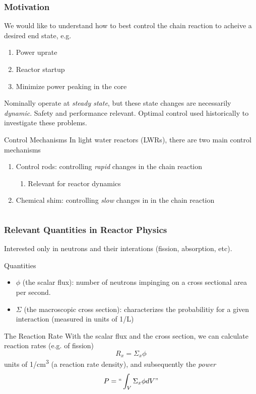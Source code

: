\documentclass[10pt,compress]{beamer}
\begin{document}
\begin{frame}\frametitle{Motivation}
We would like to understand how to best control the chain reaction to acheive a desired end state, e.g.
\begin{enumerate}
    \item Power uprate
    \item Reactor startup
    \item Minimize power peaking in the core
\end{enumerate}
Nominally operate at \emph{steady state}, but these state changes are necessarily \emph{dynamic}. 
Safety and performance relevant. Optimal control used historically to investigate these problems.

\begin{block}{Control Mechanisms}
In light water reactors (LWRs), there are two main control mechanisms
\begin{enumerate}
    \item Control rods: controlling \emph{rapid} changes in the chain reaction
    \begin{enumerate}
        \item Relevant for reactor dynamics
    \end{enumerate}
    \item Chemical shim: controlling \emph{slow} changes in in the chain reaction
\end{enumerate}
\end{block}

\begin{columns}

\end{columns}
\end{frame}

\begin{frame}\frametitle{Relevant Quantities in Reactor Physics}
Interested only in neutrons and their interations (fission, absorption, etc).
\begin{block}{Quantities}
    \begin{itemize}
        \item $\phi$ (the scalar flux): number of neutrons impinging on a cross sectional area per second.
        \item $\Sigma$ (the macroscopic cross section): characterizes the probabilitiy for a given interaction (measured in units of 1/L)
    \end{itemize}
\end{block}
\begin{block}{The Reaction Rate}
    With the scalar flux and the cross section, we can calculate reaction rates (e.g. of fission)
    \begin{equation}
        R_x = \Sigma_x \phi\nonumber
    \end{equation}
    units of \si{1/cm^3} (a reaction rate density), and subsequently the \emph{power}
    \begin{equation}
        P =``\int_V \Sigma_x \phi dV "\nonumber
    \end{equation}
\end{block}
\end{frame}
\end{document}
